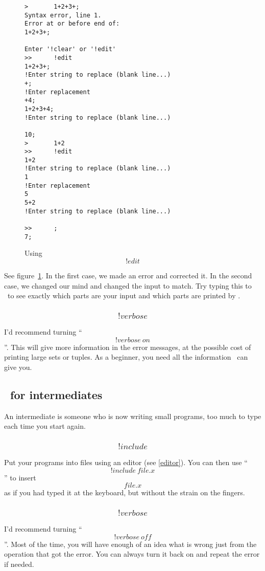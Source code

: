 \begin{figure}[btp]\begin{verbatim}
>       1+2+3+;
Syntax error, line 1.
Error at or before end of:
1+2+3+;

Enter '!clear' or '!edit'
>>      !edit
1+2+3+;
!Enter string to replace (blank line...)
+;
!Enter replacement
+4;
1+2+3+4;
!Enter string to replace (blank line...)

10;
>       1+2
>>      !edit
1+2
!Enter string to replace (blank line...)
1
!Enter replacement
5
5+2
!Enter string to replace (blank line...)

>>      ;
7;
\end{verbatim}
\caption{Using \[!edit\]\label{ex:edit}}
\end{figure}

See figure~\ref{ex:edit}.
In the first case, we made an error and corrected it.
In the second case, we changed our mind and changed the 
input to match.
Try typing this to \ISETL\ to see exactly which parts are
your input and which parts are printed by \ISETL\@.

\subsubsection{\[!verbose\]}
I'd recommend turning ``\[!verbose~on\]''.  This will give more information
in the error messages, at the possible cost of printing large sets or
tuples.  As a beginner, you need all the information \ISETL\ can give you.


\subsection{\ISETL\ for intermediates}
An intermediate is someone who is now writing small programs,
too much to type each time you start again.

\subsubsection{\[!include\]}
Put your programs into files using an editor (see \ref{editor}).
You can then use ``\[!include~file.x\]'' to insert \[file.x\] as if you had
typed it at the keyboard, but without the strain on the fingers.



\subsubsection{\[!verbose\]}
I'd recommend turning ``\[!verbose~off\]''.
Most of the time, you will have enough of an idea what is wrong just from
the operation that got the error.
You can always turn it back on and repeat the error if needed.

